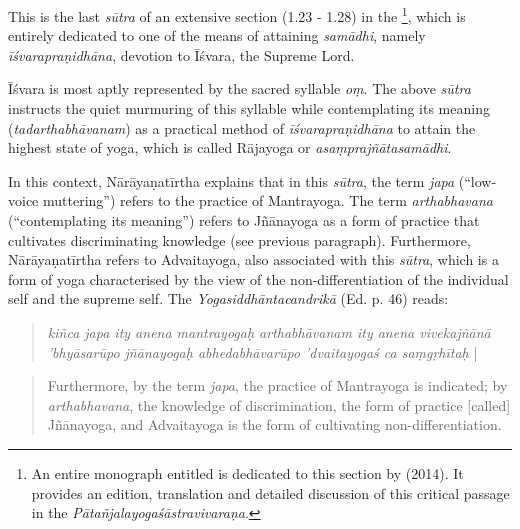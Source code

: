 This is the last \textit{sūtra} of an extensive section (1.23 - 1.28) in the \footnote{An entire monograph entitled  is dedicated to this section by \citeauthor{harimoto2014} (2014). It provides an edition, translation and detailed discussion of this critical passage in the \textit{Pātañjalayogaśāstravivaraṇa}.}, which is entirely dedicated to one of the means of attaining \textit{samādhi}, namely \textit{īśvarapraṇidhāna}, devotion to Īśvara, the Supreme Lord.

Īśvara is most aptly represented by the sacred syllable \textit{oṃ}. The above \textit{sūtra} instructs the quiet murmuring of this syllable while contemplating its meaning (\textit{tadarthabhāvanam}) as a practical method of \textit{īśvarapraṇidhāna} to attain the highest state of yoga, which is called Rājayoga or \textit{asaṃprajñātasamādhi}.

In this context, Nārāyaṇatīrtha explains that in this \textit{sūtra}, the term \textit{japa} (``low-voice muttering'') refers to the practice of Mantrayoga. The term \textit{arthabhavana} (``contemplating its meaning'') refers to Jñānayoga as a form of practice that cultivates discriminating knowledge (see previous paragraph). Furthermore, Nārāyaṇatīrtha refers to Advaitayoga, also associated with this \textit{sūtra}, which is a form of yoga characterised by the view of the non-differentiation of the individual self and the supreme self. The \textit{Yogasiddhāntacandrikā} (Ed. p. 46) reads:
\begin{quote}
  \textit{kiñca japa ity anena mantrayogaḥ arthabhāvanam ity anena vivekajñānā 'bhyāsarūpo jñānayogaḥ abhedabhāvarūpo 'dvaitayogaś ca saṃgṛhītaḥ} |
\end{quote}
\begin{quote}
Furthermore, by the term \textit{japa}, the practice of Mantrayoga is indicated; by \textit{arthabhavana}, the knowledge of discrimination, the form of practice [called] Jñānayoga, and Advaitayoga is the form of cultivating non-differentiation.
\end{quote}

